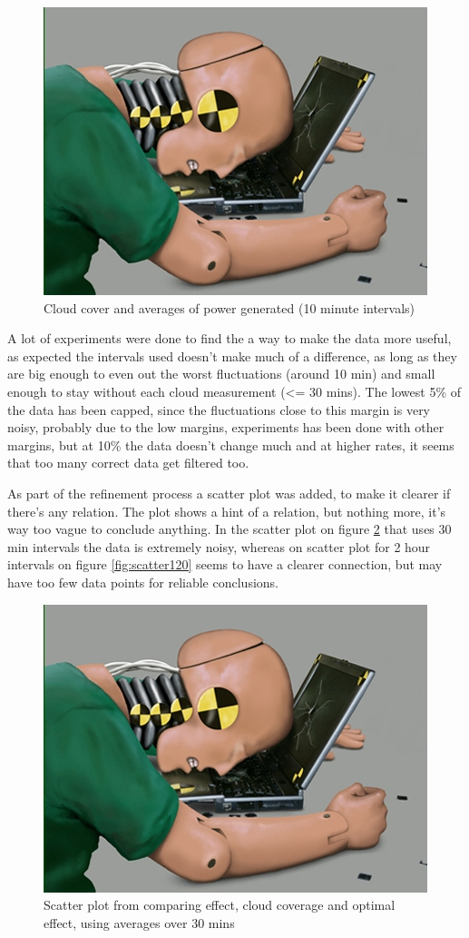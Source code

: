 \begin{figure}
  \centering
  \includegraphics{dummy.jpg}
  \caption{Cloud cover and averages of power generated (10 minute
    intervals)}
  \label{fig:cloudsAndPower}
\end{figure}

A lot of experiments were done to find the a way to make the data more
useful, as expected the intervals used doesn't make much of a
difference, as long as they are big enough to even out the worst
fluctuations (around 10 min) and small enough to stay without each
cloud measurement (<= 30 mins).  The lowest 5\% of the data has been
capped, since the fluctuations close to this margin is very noisy,
probably due to the low margins, experiments has been done with other
margins, but at 10\% the data doesn't change much and at higher rates,
it seems that too many correct data get filtered too.

As part of the refinement process a scatter plot was added, to make it
clearer if there's any relation.  The plot shows a hint of a relation,
but nothing more, it's way too vague to conclude anything.  In the
scatter plot on figure \ref{fig:scatter30} that uses 30 min intervals
the data is extremely noisy, whereas on scatter plot for 2 hour
intervals on figure \ref{fig:scatter120} seems to have a clearer
connection, but may have too few data points for reliable conclusions.

\begin{figure}
  \centering
  \includegraphics{dummy.jpg}
  \caption{Scatter plot from comparing effect, cloud coverage and
    optimal effect, using averages over 30 mins}
  \label{fig:scatter30}
\end{figure}

